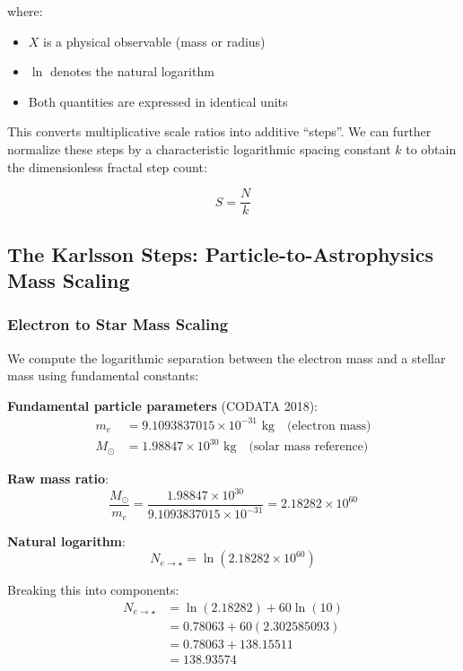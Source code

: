 \documentclass[11pt,a4paper]{article}
\begin{document}
    where:
    \begin{itemize}
    \item $X$ is a physical observable (mass or radius)
    \item $\ln$ denotes the natural logarithm
    \item Both quantities are expressed in identical units
    \end{itemize}

    This converts multiplicative scale ratios into additive ``steps''. We can further normalize these steps by a characteristic logarithmic spacing constant $k$ to obtain the dimensionless fractal step count:

    \[
    S = \frac{N}{k}
    \]

  \subsection{The Karlsson Steps: Particle-to-Astrophysics Mass Scaling}

    \subsubsection{Electron to Star Mass Scaling}

      We compute the logarithmic separation between the electron mass and a stellar mass using fundamental constants:

      \noindent\textbf{Fundamental particle parameters} (CODATA 2018):
        \begin{align*}
        m_e &= 9.1093837015 \times 10^{-31} \text{ kg} \quad \text{(electron mass)}\\
        M_\odot &= 1.98847 \times 10^{30} \text{ kg} \quad \text{(solar mass reference)}
        \end{align*}

      \noindent\textbf{Raw mass ratio}:
        \[
        \frac{M_\odot}{m_e} = \frac{1.98847 \times 10^{30}}{9.1093837015 \times 10^{-31}} = 2.18282 \times 10^{60}
        \]

      \noindent\textbf{Natural logarithm}:
        \[
        N_{e \to \star} = \ln(2.18282 \times 10^{60})
        \]

        Breaking this into components:
        \begin{align*}
        N_{e \to \star} &= \ln(2.18282) + 60 \ln(10)\\
        &= 0.78063 + 60(2.302585093)\\
        &= 0.78063 + 138.15511\\
        &= 138.93574
        \end{align*}
\end{document}
